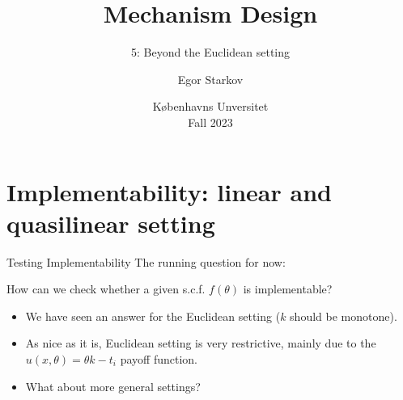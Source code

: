 \documentclass[english,10pt
,aspectratio=169
]{beamer}
\title{Mechanism Design}
\subtitle{5: Beyond the Euclidean setting}
\author{Egor Starkov}
\date{K{\o}benhavns Unversitet \\
	Fall 2023}
\begin{document}
	\frame[plain]{\titlepage}



\section{Implementability: linear and quasilinear setting}

\begin{frame}{Testing Implementability}
	The running question for now:
	\begin{exampleblock}{}
		How can we check whether a given s.c.f. $f(\theta)$ is implementable?
	\end{exampleblock} 
	\begin{itemize}
		\item We have seen an answer for the Euclidean setting ($k$ should be monotone). 
		\item As nice as it is, Euclidean setting is very restrictive, mainly due to the $u(x,\theta)=\theta k - t_i$ payoff function.
		\item What about more general settings?
	\end{itemize}
\end{frame}


%		
\end{document}
